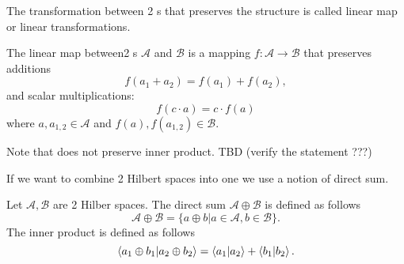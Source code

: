 The
transformation between 2 s that preserves
the structure is called 
linear map or linear transformations.
\begin{definition}
\label{def:linear_map}
The linear map between2 s $\mathcal{A}$
and $\mathcal{B}$ is a mapping $f: \mathcal{A} \to \mathcal{B}$ that
preserves additions  
\[
f(a_1 + a_2) = f(a_1) + f(a_2),
\]
and scalar multiplications:
\[
f(c \cdot a) = c \cdot f(a)
\]
where $a,a_{1,2} \in \mathcal{A}$ and $f(a), f(a_{1,2}) \in \mathcal{B}$.
\end{definition}

\begin{remark}
\label{rem:linear_map} 
Note that  does not preserve inner product.
TBD (verify the statement ???)
\end{remark}

If we want to combine 2 Hilbert spaces into one we use a notion of
direct sum.
\begin{definition}
  \label{def:fdhilb_direct_sum}
  Let $\mathcal{A}, \mathcal{B}$ are 2 Hilber spaces. The
  direct sum $\mathcal{A} \oplus \mathcal{B}$ is defined as follows
  \[
  \mathcal{A} \oplus \mathcal{B} = \{a \oplus b | a \in \mathcal{A}, b
  \in \mathcal{B}\}.
  \]
  The inner product is defined as follows
  \[
  \bra{a_1 \oplus b_1}\ket{a_2 \oplus b_2} =
  \bra{a_1}\ket{a_2} + \bra{b_1}\ket{b_2}.
  \]
\end{definition}

